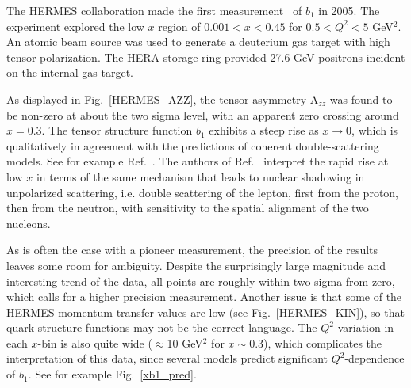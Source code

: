 The HERMES collaboration  made the first measurement~\cite{Riedl:2005jq,Airapetian:2005cb} of
$b_1$ in 2005.
The experiment explored the low $x$ region of $0.001<x<0.45$ for  $0.5<Q^2<5$ GeV$^2$.  
An atomic beam source was used to generate a deuterium gas target with high tensor polarization.  
The HERA storage ring provided 27.6 GeV positrons incident on the internal gas target.

As displayed in Fig.~\ref{HERMES_AZZ}, the tensor asymmetry A$_{zz}$  was found to be 
non-zero at about the  two sigma level, with an apparent zero crossing around $x=0.3$. %
%
The tensor structure function $b_1$ exhibits a steep rise as $x\to 0$, which is qualitatively
in agreement with the predictions of coherent double-scattering models. See for example Ref.~\cite{Edelmann:1997ik}.  The authors of Ref.~\cite{Airapetian:2005cb} interpret the rapid rise at low $x$ in terms of the same mechanism that leads to nuclear shadowing in unpolarized scattering, i.e. double scattering of the lepton, first from the proton, then from the neutron, with sensitivity to the spatial alignment of the two nucleons.

As is often the case with a pioneer measurement, the precision of the results leaves some
room for ambiguity.  Despite the surprisingly large magnitude and interesting trend of the data, 
all points are roughly within two sigma from zero, which calls for a higher precision measurement.
Another issue is that some of the HERMES momentum transfer values are low 
(see Fig.~\ref{HERMES_KIN}), so that quark structure functions may not be the correct language. 
The $Q^2$ variation in each $x$-bin is also quite wide ($\approx$10 GeV$^2$ for $x\sim 0.3$), which complicates
the interpretation of this data, since  several models predict significant $Q^2$-dependence of
 $b_1$. See for example Fig.~\ref{xb1_pred}.



